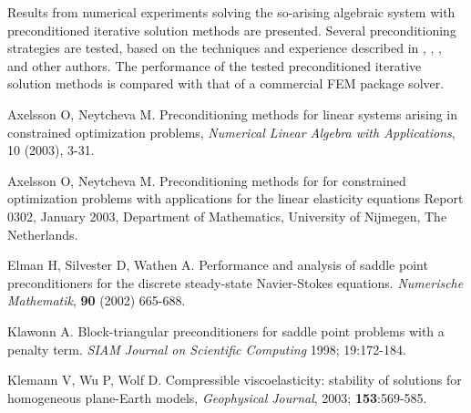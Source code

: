 \documentclass{report}
\begin{document}
Results from numerical experiments solving the so-arising algebraic
system with preconditioned iterative solution methods are presented.
Several preconditioning strategies are tested, based on the techniques
and experience described in \cite{Klawonn},
\cite{elman}, \cite{AxelssonNeytcheva}, \cite{AxelssonNeytcheva1} and other
authors.
The performance of the tested preconditioned iterative solution methods
is compared with that of a commercial FEM package solver.

\begin{thebibliography}{ABC}
Axelsson O, Neytcheva M.
Preconditioning methods for linear systems arising in constrained
optimization problems,
{\em Numerical Linear Algebra with Applications}, 10 (2003), 3-31.

Axelsson O, Neytcheva M.
Preconditioning methods for for constrained optimization problems
with applications for the linear elasticity equations
Report 0302, January 2003, Department of Mathematics,
University of Nijmegen, The Netherlands.

Elman H, Silvester D, Wathen A. Performance and analysis of saddle
point preconditioners for the discrete steady-state Navier-Stokes equations.
\textit{Numerische Mathematik}, {\bf 90} (2002) 665-688.

 Klawonn A. Block-triangular preconditioners for saddle
point problems with a penalty term. {\em SIAM Journal on Scientific
Computing} 1998;
19:172-184.

Klemann V, Wu P, Wolf D. Compressible viscoelasticity: stability of
solutions for homogeneous plane-Earth models,
\textit{Geophysical Journal}, 2003; \textbf{153}:569-585.


\end{thebibliography}
\end{document}
